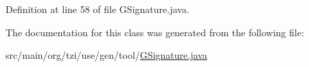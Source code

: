 Definition at line 58 of file G\-Signature.\-java.



The documentation for this class was generated from the following file\-:\begin{DoxyCompactItemize}
\item 
src/main/org/tzi/use/gen/tool/\hyperlink{_g_signature_8java}{G\-Signature.\-java}\end{DoxyCompactItemize}
